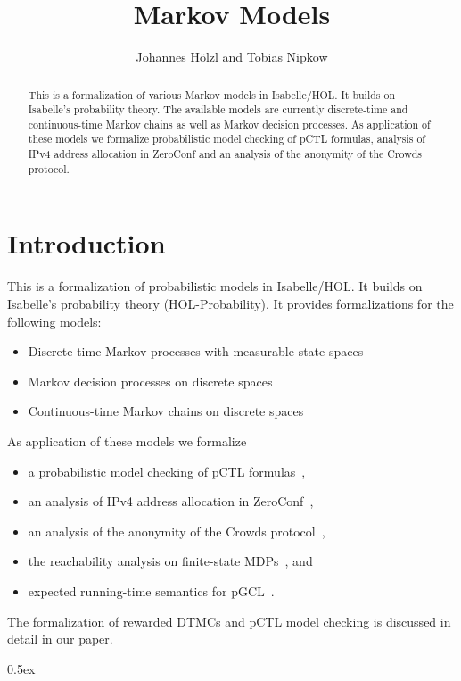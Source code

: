 \documentclass[11pt,a4paper]{article}
\begin{document}
\title{Markov Models}
\author{Johannes H\"olzl and Tobias Nipkow}
\maketitle

\begin{abstract}
This is a formalization of various Markov models in Isabelle/HOL. It builds on Isabelle's
probability theory. The available models are currently discrete-time and continuous-time Markov
chains as well as Markov decision processes. As application of these models we formalize
probabilistic model checking of pCTL formulas, analysis of IPv4 address allocation in ZeroConf and
an analysis of the anonymity of the Crowds protocol.
\end{abstract}

\tableofcontents

\section{Introduction}

This is a formalization of probabilistic models in Isabelle/HOL. It builds on Isabelle's probability
theory (HOL-Probability). It provides formalizations for the following models:

\begin{itemize}
\item Discrete-time Markov processes with measurable state spaces~\cite{hoelzl2017markovprocesses}
\item Markov decision processes on discrete spaces~\cite{hoelzl2017mdp}
\item Continuous-time Markov chains on discrete spaces~\cite{hoelzl2017markovprocesses}
\end{itemize}

As application of these models we formalize
\begin{itemize}
\item a probabilistic model checking of pCTL formulas~\cite{hoelzl2012verifyingpctl},
\item an analysis of IPv4 address allocation in ZeroConf~\cite{hoelzl2012casestudies},
\item an analysis of the anonymity of the Crowds protocol~\cite{hoelzl2012casestudies},
\item the reachability analysis on finite-state MDPs~\cite{hoelzl2017mdp}, and
\item expected running-time semantics for pGCL~\cite{hoelzl2016exprun}.
\end{itemize}

The formalization of rewarded DTMCs and pCTL model checking is discussed in
detail in our paper.

\parindent 0pt\parskip 0.5ex





\end{document}
